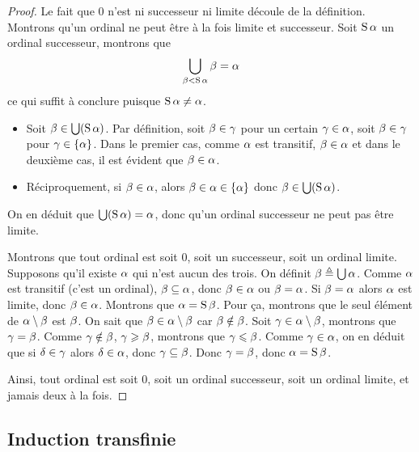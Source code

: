 \begin{proof}
  Le fait que $0$ n'est ni successeur ni limite découle de la définition.
  Montrons qu'un ordinal ne peut être à la fois limite et successeur. Soit
  $\operatorname{S}\alpha$ un ordinal successeur, montrons que
  \[ \bigcup_{\beta < \operatorname{S}\alpha} \beta = \alpha\]
  ce qui suffit à conclure puisque $\operatorname{S}\alpha \neq \alpha$.
  \begin{itemize}
  \item Soit $\beta \in \bigcup (\operatorname{S}\alpha)$. Par définition, soit
    $\beta\in\gamma$ pour un certain $\gamma \in \alpha$, soit
    $\beta \in \gamma$ pour $\gamma \in \{\alpha\}$. Dans le premier cas,
    comme $\alpha$ est transitif, $\beta\in\alpha$ et dans le deuxième cas, il
    est évident que $\beta\in\alpha$.
  \item Réciproquement, si $\beta \in \alpha$, alors
    $\beta \in \alpha \in \{\alpha \}$ donc $\beta \in \bigcup(\operatorname{S}\alpha)$.
  \end{itemize}
  On en déduit que $\bigcup(\operatorname{S}\alpha)=\alpha$, donc qu'un ordinal successeur
  ne peut pas être limite.

  Montrons que tout ordinal est soit $0$, soit un successeur, soit un ordinal
  limite. Supposons qu'il existe $\alpha$ qui n'est aucun des trois. On définit
  $\beta \triangleq \bigcup \alpha$. Comme $\alpha$ est transitif
  (c'est un ordinal),
  $\beta \subseteq \alpha$, donc $\beta \in \alpha$ ou $\beta = \alpha$.
  Si $\beta = \alpha$ alors $\alpha$ est limite, donc $\beta \in \alpha$.
  Montrons que $\alpha = \operatorname{S}\beta$. Pour ça, montrons que le seul élément de
  $\alpha\setminus \beta$ est $\beta$. On sait que
  $\beta \in \alpha \setminus\beta$ car $\beta\notin\beta$. Soit
  $\gamma\in\alpha\setminus\beta$, montrons que $\gamma = \beta$.
  Comme $\gamma\notin\beta$, $\gamma \geqslant \beta$, montrons que
  $\gamma\leqslant\beta$. Comme $\gamma \in \alpha$, on en déduit que si
  $\delta\in\gamma$ alors $\delta \in \alpha$, donc $\gamma\subseteq \beta$.
  Donc $\gamma = \beta$, donc $\alpha = \operatorname{S}\beta$.

  Ainsi, tout ordinal est soit $0$, soit un ordinal successeur, soit un ordinal
  limite, et jamais deux à la fois.
\end{proof}

\subsection{Induction transfinie}\label{subsec.ind.transf}

